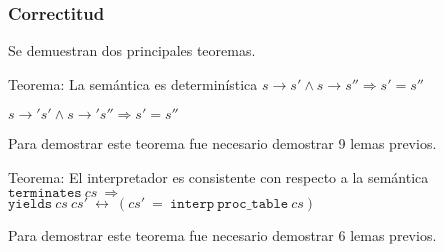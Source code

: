 \begin{frame}
\frametitle{Correctitud}

Se demuestran dos principales teoremas.

\begin{block}{Teorema: La semántica es determinística}
$s \rightarrow s' \land s \rightarrow s'' \Longrightarrow s' = s''$

$s \rightarrow' s' \land s \rightarrow' s'' \Longrightarrow s' = s''$
\end{block}

Para demostrar este teorema fue necesario demostrar 9 lemas previos.


\begin{block}{Teorema: El interpretador es consistente con respecto a la semántica}
$\mathtt{terminates}\ cs\ \Longrightarrow\ $
\\
$\mathtt{yields}\ cs\ cs'\ \longleftrightarrow\ (cs'\ =\ \mathtt{interp}\ \mathtt{proc\_table}\ cs)$
\end{block}

Para demostrar este teorema fue necesario demostrar 6 lemas previos.

\end{frame}

